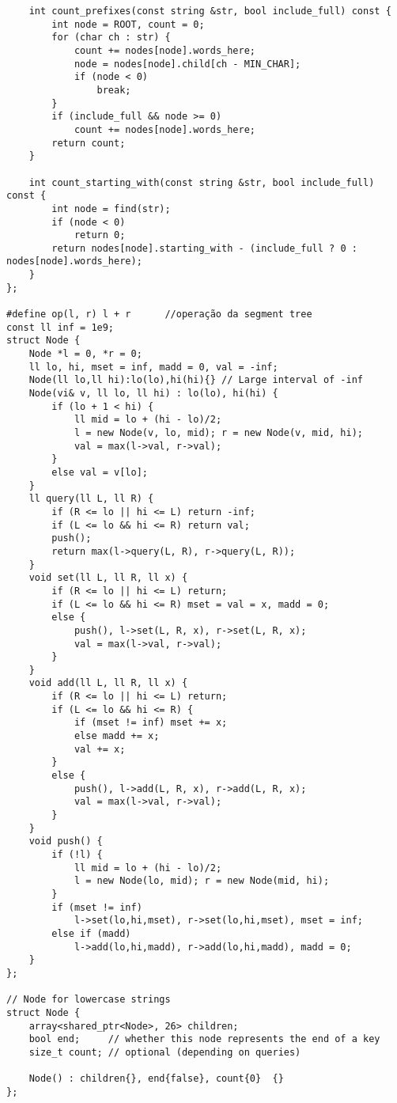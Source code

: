 \documentclass{article}
\begin{document}
\begin{lstlisting}
    int count_prefixes(const string &str, bool include_full) const {
        int node = ROOT, count = 0;
        for (char ch : str) {
            count += nodes[node].words_here;
            node = nodes[node].child[ch - MIN_CHAR];
            if (node < 0)
                break;
        }
        if (include_full && node >= 0)
            count += nodes[node].words_here;
        return count;
    }

    int count_starting_with(const string &str, bool include_full) const {
        int node = find(str);
        if (node < 0)
            return 0;
        return nodes[node].starting_with - (include_full ? 0 : nodes[node].words_here);
    }
};

#define op(l, r) l + r		//operação da segment tree
const ll inf = 1e9;
struct Node {
    Node *l = 0, *r = 0;
    ll lo, hi, mset = inf, madd = 0, val = -inf;
    Node(ll lo,ll hi):lo(lo),hi(hi){} // Large interval of -inf
    Node(vi& v, ll lo, ll hi) : lo(lo), hi(hi) {
        if (lo + 1 < hi) {
            ll mid = lo + (hi - lo)/2;
            l = new Node(v, lo, mid); r = new Node(v, mid, hi);
            val = max(l->val, r->val);
        }
        else val = v[lo];
    }
    ll query(ll L, ll R) {
        if (R <= lo || hi <= L) return -inf;
        if (L <= lo && hi <= R) return val;
        push();
        return max(l->query(L, R), r->query(L, R));
    }
    void set(ll L, ll R, ll x) {
        if (R <= lo || hi <= L) return;
        if (L <= lo && hi <= R) mset = val = x, madd = 0;
        else {
            push(), l->set(L, R, x), r->set(L, R, x);
            val = max(l->val, r->val);
        }
    }
    void add(ll L, ll R, ll x) {
        if (R <= lo || hi <= L) return;
        if (L <= lo && hi <= R) {
            if (mset != inf) mset += x;
            else madd += x;
            val += x;
        }
        else {
            push(), l->add(L, R, x), r->add(L, R, x);
            val = max(l->val, r->val);
        }
    }
    void push() {
        if (!l) {
            ll mid = lo + (hi - lo)/2;
            l = new Node(lo, mid); r = new Node(mid, hi);
        }
        if (mset != inf)
            l->set(lo,hi,mset), r->set(lo,hi,mset), mset = inf;
        else if (madd)
            l->add(lo,hi,madd), r->add(lo,hi,madd), madd = 0;
    }
};

// Node for lowercase strings
struct Node {
	array<shared_ptr<Node>, 26> children;
	bool end;     // whether this node represents the end of a key
	size_t count; // optional (depending on queries)

	Node() : children{}, end{false}, count{0}  {}
};


\end{lstlisting}
\end{document}
